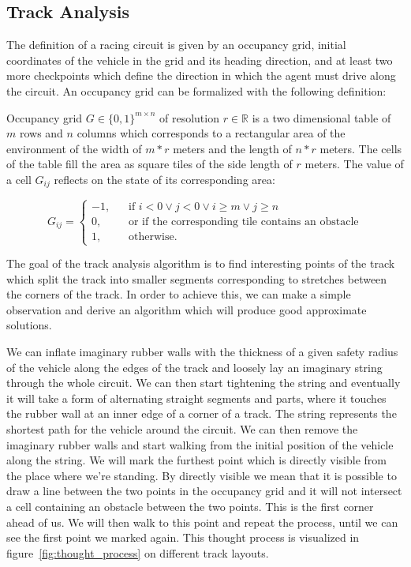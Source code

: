 \subsection{Track Analysis}

The definition of a racing circuit is given by an occupancy grid, initial coordinates of the vehicle in the grid and its heading direction, and at least two more checkpoints which define the direction in which the agent must drive along the circuit. An occupancy grid can be formalized with the following definition:

\begin{defn}\label{def:occupancy_grid}
    Occupancy grid $G\in\{0, 1\}^{m\times n}$ of resolution $r\in\mathbb{R}$ is a two dimensional table of $m$ rows and $n$ columns which corresponds to a rectangular area of the environment of the width of $m * r$ meters and the length of $n * r$ meters. The cells of the table fill the area as square tiles of the side length of $r$ meters. The value of a cell $G_{ij}$ reflects on the state of its corresponding area:
    
\[
G_{ij} =
     \begin{cases}
       -1\text{,} &\quad\text{if } i < 0 \vee j < 0 \vee i \geq m \vee j \geq n\\
       0\text{,} &\quad\text{or if the corresponding tile contains an obstacle} \\
       1\text{,} &\quad\text{otherwise.}
     \end{cases}
\]
\end{defn}

The goal of the track analysis algorithm is to find interesting points of the track which split the track into smaller segments corresponding to stretches between the corners of the track. In order to achieve this, we can make a simple observation and derive an algorithm which will produce good approximate solutions.

We can inflate imaginary rubber walls with the thickness of a given safety radius of the vehicle along the edges of the track and loosely lay an imaginary string through the whole circuit. We can then start tightening the string and eventually it will take a form of alternating straight segments and parts, where it touches the rubber wall at an inner edge of a corner of a track. The string represents the shortest path for the vehicle around the circuit. We can then remove the imaginary rubber walls and start walking from the initial position of the vehicle along the string. We will mark the furthest point which is directly visible from the place where we're standing. By directly visible we mean that it is possible to draw a line between the two points in the occupancy grid and it will not intersect a cell containing an obstacle between the two points. This is the first corner ahead of us. We will then walk to this point and repeat the process, until we can see the first point we marked again. This thought process is visualized in figure~\ref{fig:thought_process} on different track layouts.

